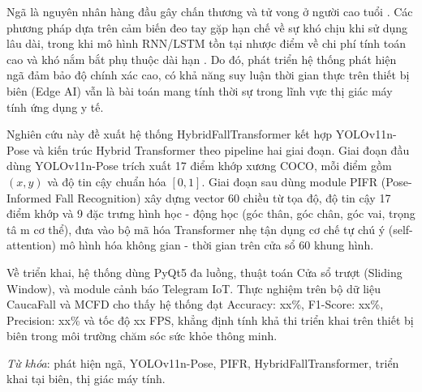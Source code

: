 Ngã là nguyên nhân hàng đầu gây chấn thương và tử vong ở người cao tuổi \cite{who2021falls}. Các phương pháp dựa trên cảm biến đeo tay gặp hạn chế về sự khó chịu khi sử dụng lâu dài, trong khi mô hình RNN/LSTM tồn tại nhược điểm về chi phí tính toán cao và khó nắm bắt phụ thuộc dài hạn \cite{benabdennour2026real}. Do đó, phát triển hệ thống phát hiện ngã đảm bảo độ chính xác cao, có khả năng suy luận thời gian thực trên thiết bị biên (Edge AI) vẫn là bài toán mang tính thời sự trong lĩnh vực thị giác máy tính ứng dụng y tế.

Nghiên cứu này đề xuất hệ thống HybridFallTransformer kết hợp YOLOv11n-Pose \cite{khanam2024yolov11} 
và kiến trúc Hybrid Transformer \cite{benabdennour2026real} theo pipeline hai giai đoạn. Giai đoạn đầu
 dùng YOLOv11n-Pose trích xuất 17 điểm khớp xương COCO, mỗi điểm gồm $(x, y)$ và độ tin cậy chuẩn hóa $[0, 1]$.
  Giai đoạn sau dùng module PIFR (Pose-Informed Fall Recognition) \cite{kong2025pifr} xây dựng vector 60 chiều 
  từ tọa độ, độ tin cậy 17 điểm khớp và 9 đặc trưng hình học - động học (góc thân, góc chân, góc vai, trọng tâ
  m cơ thể), đưa vào bộ mã hóa Transformer nhẹ tận dụng cơ chế tự chú ý (self-attention) mô hình hóa không gian
   - thời gian trên cửa sổ 60 khung hình.

Về triển khai, hệ thống dùng PyQt5 đa luồng, thuật toán Cửa sổ trượt (Sliding Window), và module cảnh báo Telegram IoT. Thực nghiệm trên bộ dữ liệu CaucaFall \cite{guerrero2022caucafall} và MCFD \cite{auvinet2010mcfd} cho thấy hệ thống đạt Accuracy: xx\%, F1-Score: xx\%, Precision: xx\% và tốc độ xx FPS, khẳng định tính khả thi triển khai trên thiết bị biên trong môi trường chăm sóc sức khỏe thông minh.

\vspace{0.5cm}
\textit{Từ khóa}: phát hiện ngã, YOLOv11n-Pose, PIFR, HybridFallTransformer, triển khai tại biên, thị giác máy tính.
